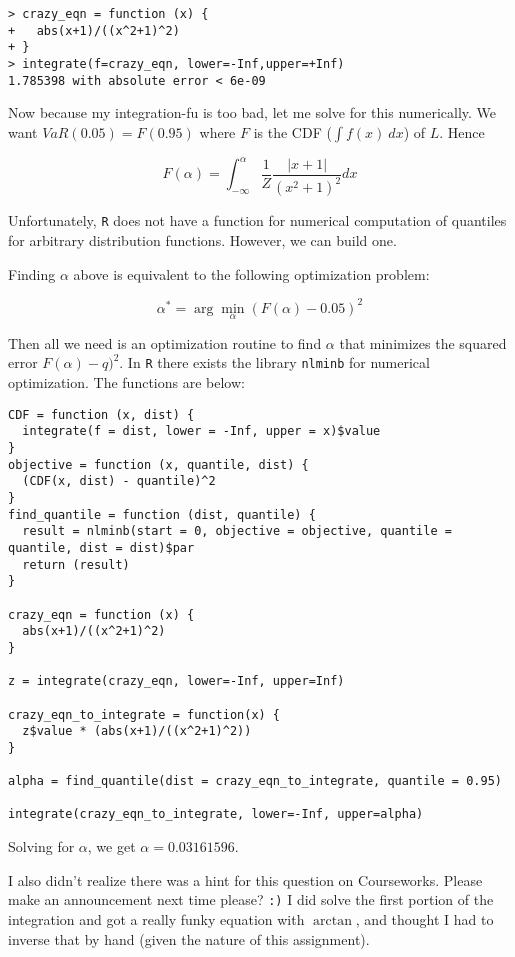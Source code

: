 \documentclass[11pt]{scrartcl}
\begin{document}
\begin{lstlisting}
> crazy_eqn = function (x) {
+   abs(x+1)/((x^2+1)^2)
+ }
> integrate(f=crazy_eqn, lower=-Inf,upper=+Inf)
1.785398 with absolute error < 6e-09
\end{lstlisting}

Now because my integration-fu is too bad, let me solve for this numerically. We want $VaR(0.05) = F(0.95)$ where $F$ is the CDF ($\int f(x) \:dx$) of $L$. Hence

\[F(\alpha) = \int_{-\infty}^\alpha \frac{1}{Z} \frac{|x+1|}{(x^2+1)^2}dx\]

Unfortunately, \texttt{R} does not have a function for numerical computation of quantiles for arbitrary distribution functions. However, we can build one.

Finding $\alpha$ above is equivalent to the following optimization problem:

\[\alpha^* = \arg\min_{\alpha} (F(\alpha) - 0.05)^2\]

Then all we need is an optimization routine to find $\alpha$ that minimizes the squared error $F(\alpha) - q)^2$. In \texttt{R} there exists the library \texttt{nlminb} for numerical optimization. The functions are below:

\begin{lstlisting}
CDF = function (x, dist) {
  integrate(f = dist, lower = -Inf, upper = x)$value
}
objective = function (x, quantile, dist) {
  (CDF(x, dist) - quantile)^2
}
find_quantile = function (dist, quantile) {
  result = nlminb(start = 0, objective = objective, quantile = quantile, dist = dist)$par
  return (result)
}

crazy_eqn = function (x) {
  abs(x+1)/((x^2+1)^2)
}

z = integrate(crazy_eqn, lower=-Inf, upper=Inf)

crazy_eqn_to_integrate = function(x) {
  z$value * (abs(x+1)/((x^2+1)^2))
}

alpha = find_quantile(dist = crazy_eqn_to_integrate, quantile = 0.95)

integrate(crazy_eqn_to_integrate, lower=-Inf, upper=alpha)
\end{lstlisting}

Solving for $\alpha$, we get $\alpha = 0.03161596$.

I also didn't realize there was a hint for this question on Courseworks. Please make an announcement next time please? \texttt{:)} I did solve the first portion of the integration and got a really funky equation with $\arctan$, and thought I had to inverse that by hand (given the nature of this assignment).
\end{document}
